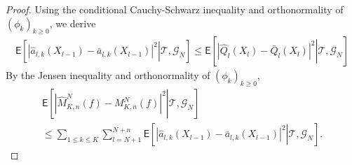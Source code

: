 \documentclass[article]{elsarticle}
\def\TrainSet{\mathcal{T}}
\begin{document}
\begin{proof}
Using the conditional Cauchy-Schwarz inequality and  orthonormality of \((\phi_k)_{k\geq 0}\), we derive
\begin{eqnarray*}
\mathsf{E}\left[\left.\left|\widehat{a}_{l,k}(X_{l-1})-\bar a_{l,k}(X_{l-1})\right|^{2}\right | \TrainSet, \mathcal{G}_N\right]\leq\mathsf{E}\left[\left.\left|\widehat{Q}_{l}\left(X_{l}\right)-\bar Q_{l}\left(X_{l}\right)\right|^{2}\right | \TrainSet, \mathcal{G}_N\right]
\end{eqnarray*}
By the Jensen inequality and orthonormality of \((\phi_k)_{k\geq 0},\)
\begin{multline*}
\mathsf{E}\left[\left.\left|\widehat{M}_{K,n}^{N}(f)-M_{K,n}^{N}(f)\right|^{2}\right | \TrainSet, \mathcal{G}_N\right]
\\
\leq \sum_{1\leq k\le K}\sum_{l=N+1}^{N+n}\mathsf{E}\left[\left.\left|\widehat{a}_{l,k}(X_{l-1})-\bar a_{l,k}(X_{l-1})\right|^{2}\right | \TrainSet, \mathcal{G}_N\right].
\end{multline*}
\end{proof}
\end{document}
